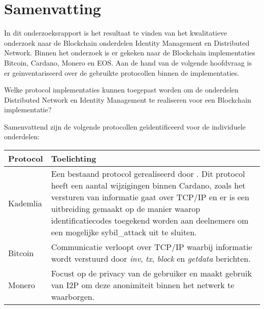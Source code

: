 \newpage
\chapter*{Samenvatting}

In dit onderzoeksrapport is het resultaat te vinden van het kwalitatieve onderzoek naar de Blockchain onderdelen Identity Management en Distributed Network. Binnen het onderzoek is er gekeken naar de Blockchain implementaties Bitcoin, Cardano, Monero en EOS. Aan de hand van de volgende hoofdvraag is er geinventariseerd over de gebruikte protocollen binnen de implementaties.

\begin{formal}
  Welke protocol implementaties kunnen toegepast worden om de onderdelen Distributed Network en Identity Management te realiseren voor een Blockchain implementatie?
\end{formal}

Samenvattend zijn de volgende protocollen geïdentificeerd voor de individuele onderdelen:

\begin{tabular}{|p{5cm}|p{10cm}|}
  \hline
  \textbf{Protocol} & \textbf{Toelichting} \\
  \hline
  Kademlia & Een bestaand protocol gerealiseerd door \cite{maymounkov2002kademlia}. Dit protocol heeft een aantal wijzigingen binnen Cardano, zoals het versturen van informatie gaat over TCP/IP en er is een uitbreiding gemaakt op de manier waarop identificatiecodes toegekend worden aan deelnemers om een mogelijke \gls{sybil_attack} uit te sluiten. \\
  \hline
  Bitcoin & Communicatie verloopt over TCP/IP waarbij informatie wordt verstuurd door \textit{inv}, \textit{tx}, \textit{block} en \textit{getdata} berichten. \\
  \hline
  Monero & Focust op de privacy van de gebruiker en maakt gebruik van \acrfull{I2P} om deze anonimiteit binnen het netwerk te waarborgen. \\
  \hline
\end{tabular}


